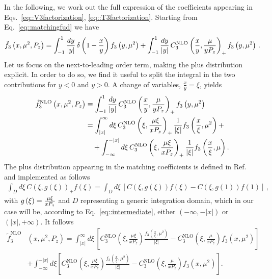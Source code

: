 In the following, we work out the full expression of the coefficients appearing in Eqs.~\eqref{eq::V3factorization}, \eqref{eq::T3factorization}.
Starting from Eq.~\eqref{eq::matchingfud} we have
\begin{align}
	\label{eq::explicitmatching}
	\tilde{f}_3\left(x,\mu^2,P_z\right) = \int_{-1}^{1} \frac{dy}{|y|}\, \delta\left( 1- \frac{x}{y} \right)  
	f_{3}\left( y, {\mu}^2\right) + \int_{-1}^{1} \frac{dy}{|y|}\, C_{3}^{\text{NLO}}\left(\frac{x}{y},\frac{\mu}{y P_z}\right)_+  
	f_{3}\left( y, {\mu}^2\right)\, .
\end{align}
Let us focus on the next-to-leading order term, making the plus distribution
explicit. In order to do so, we find it useful to split the integral in the two
contributions for $y<0$ and $y>0$. A change of variables, $\frac{x}{y} =
\xi$, yields 
\begin{align}
\label{eq::intermediate}
	\tilde{f}_3^{\text{NLO}}\left(x,\mu^2,P_z\right) 
	  & \equiv \int_{-1}^{1} \frac{dy}{|y|}\, 
	C_{3}^{\text{NLO}}\left(\frac{x}{y},\frac{\mu}{y P_z}\right)_+ 
	f_{3}\left( y, \mu^2\right) \nonumber \\ 
	  & = \int_{|x|}^{\infty} d\xi\,          
	C_3^{\text{NLO}}\left(\xi,\frac{\mu\xi}{x P_z}\right)_+ 
	\frac{1}{|\xi|} f_3\left(\frac{x}{\xi},\mu^2\right) + \nonumber \\
	  & \quad + \int_{-\infty}^{-|x|} d\xi\,  
	C_3^{\text{NLO}}\left(\xi,\frac{\mu\xi}{xP_z}\right)_+ 
	\frac{1}{|\xi|} f_3\left(\frac{x}{\xi},\mu\right). 
\end{align}
%
The plus distribution appearing in the matching coefficients is defined in Ref.~\cite{Izubuchi:2018srq} and implemented as
follows
\begin{align}
	\int_D d\xi\, 
	C\left(\xi,g\left(\xi\right)\right)_+ f\left(\xi\right) 
	= \int_D d\xi\,
	\left[C\left(\xi,g\left(\xi\right)\right)f\left(\xi\right) - 
	C\left(\xi,g\left(1\right)\right)f\left(1\right) \right]\, , 
\end{align}
with $g\left(\xi\right) =\frac{\mu\xi}{xP_z} $ and $D$ representing a generic integration domain, which in our case will be, according to Eq.~\eqref{eq::intermediate},
either $\left(-\infty,-|x|\right)$ or $\left(|x|,+\infty\right)$. 
It follows
\begin{align}
	\tilde{f}_3^{\text{NLO}}&\left(x,\mu^2,P_z\right) 
	   =\int_{|x|}^{\infty} d\xi\, 
	  \left[ C_3^{\text{NLO}}\left(\xi,\frac{\mu\xi}{xP_z}\right)
	  \frac{f_3\left(\frac{x}{\xi},\mu^2\right)}{|\xi|} - 
	  C_3^{\text{NLO}}\left(\xi,\frac{\mu}{xP_z}\right) f_3\left(x,\mu^2\right)\right] \nonumber \\
	  &  
	  + \int_{-\infty}^{-|x|}d\xi
	  \left[C_3^{\text{NLO}}\left(\xi,\frac{\mu\xi}{xP_z}\right)
	  \frac{f_3\left(\frac{x}{\xi},\mu^2\right)}{|\xi|} - 
	  C_3^{\text{NLO}}\left(\xi,\frac{\mu}{xP_z}\right)f_3\left(x,\mu^2\right)\right]. 
\end{align}
